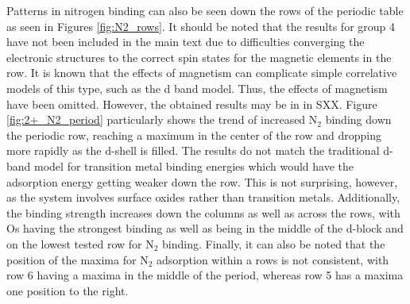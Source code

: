\documentclass[catalysts,article,submit,moreauthors,pdftex,10pt,a4paper]{mdpi}
\theoremstyle{mdpi}
\newcounter{ex}
\newcounter{re}
\theoremstyle{mdpidefinition}
\begin{document}


Patterns in nitrogen binding can also be seen down the rows of the periodic table as seen in Figures \ref{fig:N2_rows}. It should be noted that the results for group 4 have not been included in the main text due to difficulties converging the electronic structures to the correct spin states for the magnetic elements in the row. It is known that the effects of magnetism can complicate simple correlative models of this type, such as the d band model.\cite{Bhattacharjee_2016} Thus, the effects of magnetism have been omitted. However, the obtained results may be in in SXX. Figure \ref{fig:2+_N2_period} particularly shows the trend of increased N$_2$ binding down the periodic row, reaching a maximum in the center of the row and dropping more rapidly as the d-shell is filled. The results do not match the traditional d-band model\cite{Nilsson_2008} for transition metal binding energies which would have the adsorption energy getting weaker down the row. This is not surprising, however, as the system involves surface oxides rather than transition metals. Additionally, the binding strength increases down the columns as well as across the rows, with Os having the strongest binding as well as being in the middle of the d-block and on the lowest tested row for N$_2$ binding. Finally, it can also be noted that the position of the maxima for N$_2$ adsorption within a rows is not consistent, with row 6 having a maxima in the middle of the period, whereas row 5 has a maxima one position to the right.
\end{document}
